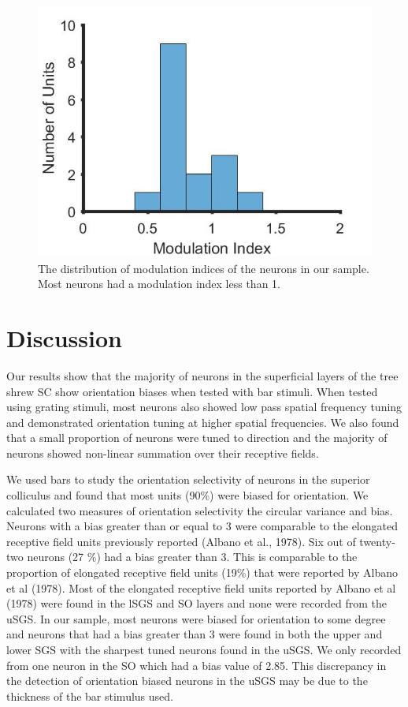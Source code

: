 	\begin{figure}[H]
		\includegraphics[width=\linewidth]{superiorcolliculus/modulation_index.jpg}
		\caption{The distribution of modulation indices of the
			neurons in our sample. Most neurons had a modulation index less than 1.}
		\label{fig:sc_mi}			
	\end{figure}
	\pagebreak
	\section{Discussion}
Our results show that the majority of neurons in the superficial layers
of the tree shrew SC show orientation biases when tested with bar
stimuli. When tested using grating stimuli, most neurons also showed low
pass spatial frequency tuning and demonstrated orientation tuning at
higher spatial frequencies. We also found that a small proportion of
neurons were tuned to direction and the majority of neurons showed
non-linear summation over their receptive fields.

We used bars to study the orientation selectivity of neurons in the
superior colliculus and found that most units (90\%) were biased for
orientation. We calculated two measures of orientation selectivity the
circular variance and bias. Neurons with a bias greater than or equal to
3 were comparable to the elongated receptive field units previously
reported (Albano et al., 1978). Six out of twenty-two neurons (27 \%)
had a bias greater than 3. This is comparable to the proportion of
elongated receptive field units (19\%) that were reported by Albano et
al (1978). Most of the elongated receptive field units reported by
Albano et al (1978) were found in the lSGS and SO layers and none were
recorded from the uSGS. In our sample, most neurons were biased for
orientation to some degree and neurons that had a bias greater than 3
were found in both the upper and lower SGS with the sharpest tuned
neurons found in the uSGS. We only recorded from one neuron in the SO
which had a bias value of 2.85. This discrepancy in the detection of
orientation biased neurons in the uSGS may be due to the thickness of
the bar stimulus used.

